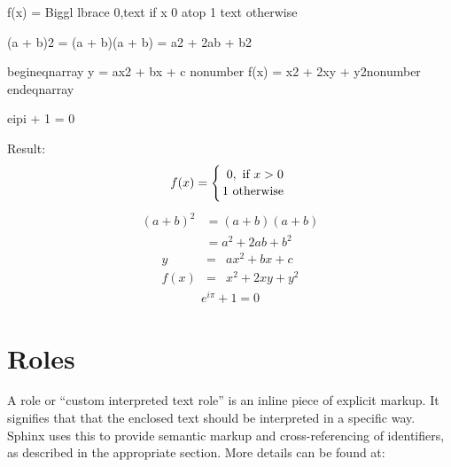 \documentclass[letterpaper,12pt,english]{sphinxmanual}
\begin{document}
\begin{sphinxVerbatim}[commandchars=\\\{\}]
 

        f(x)
        =
        \PYGZbs{}Biggl \PYGZbs{}lbrace
        \PYGZob{}
        0,\PYGZbs{}text\PYGZob{} if \PYGZcb{}
           \PYGZob{} x \PYGZgt{}0\PYGZcb{}
        \PYGZbs{}atop
        1 \PYGZbs{}text\PYGZob{} otherwise \PYGZcb{}
        \PYGZcb{}

 

   (a + b)\PYGZca{}2  \PYGZam{}=  (a + b)(a + b) \PYGZbs{}\PYGZbs{}
              \PYGZam{}=  a\PYGZca{}2 + 2ab + b\PYGZca{}2

 

   \PYGZbs{}begin\PYGZob{}eqnarray\PYGZcb{}
      y    \PYGZam{} = \PYGZam{} ax\PYGZca{}2 + bx + c \PYGZbs{}nonumber\PYGZbs{}\PYGZbs{}
      f(x) \PYGZam{} = \PYGZam{} x\PYGZca{}2 + 2xy + y\PYGZca{}2\PYGZbs{}nonumber
   \PYGZbs{}end\PYGZob{}eqnarray\PYGZcb{}

  e\PYGZca{}\PYGZob{}i\PYGZbs{}pi\PYGZcb{} + 1 = 0
    
\end{sphinxVerbatim}

Result:
\begin{equation*}
\begin{split}f(x)
=
\Biggl \lbrace
{
0,\text{ if }
   { x >0}
\atop
1 \text{ otherwise }
}\end{split}
\end{equation*}\begin{equation*}
\begin{split}(a + b)^2  &=  (a + b)(a + b) \\
           &=  a^2 + 2ab + b^2\end{split}
\end{equation*}\begin{eqnarray}
   y    & = & ax^2 + bx + c \nonumber\\
   f(x) & = & x^2 + 2xy + y^2\nonumber
\end{eqnarray}\begin{equation}\label{equation:rtxt:euler}
\begin{split}e^{i\pi} + 1 = 0\end{split}
\end{equation}

\section{Roles}
\label{\detokenize{rtxt:roles}}
A role or “custom interpreted text role” is an inline piece of explicit markup. It signifies that that the enclosed text should be interpreted in a specific way. Sphinx uses this to provide semantic markup and cross-referencing of identifiers, as described in the appropriate section. More details can be found at: 
\end{document}
